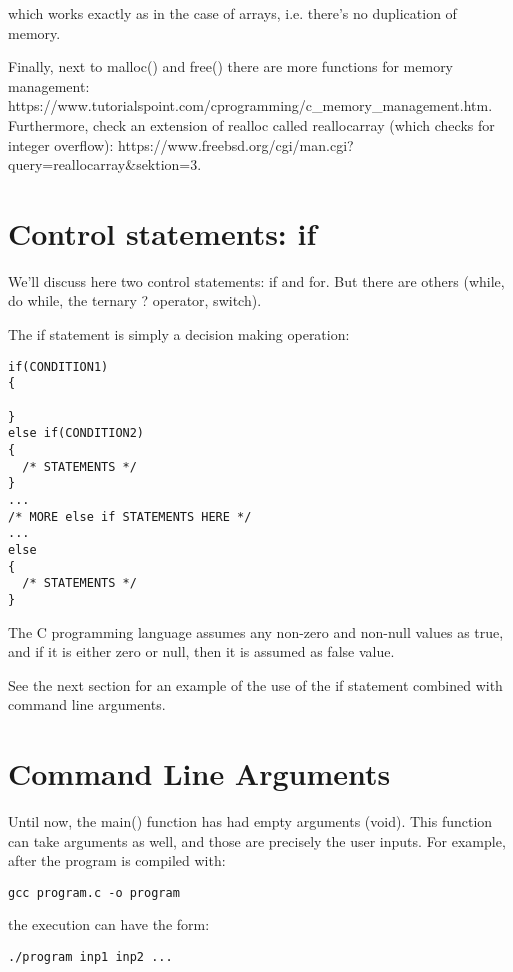 \documentclass[11pt]{article}
\begin{document}
which works exactly as in the case of arrays, i.e. there's no duplication of memory.

Finally, next to malloc() and free() there are more functions for memory management: https://www.tutorialspoint.com/cprogramming/c\_memory\_management.htm. Furthermore, check an extension of realloc called reallocarray (which checks for integer overflow): https://www.freebsd.org/cgi/man.cgi?query=reallocarray\&sektion=3.


\section{Control statements: if}

We'll discuss here two control statements: if and for. But there are others (while, do while, the ternary ? operator, switch).

The if statement is simply a decision making operation:


\begin{lstlisting}[numbers=none]
if(CONDITION1)
{
  
}
else if(CONDITION2)
{
  /* STATEMENTS */
}
...
/* MORE else if STATEMENTS HERE */
...
else
{
  /* STATEMENTS */
}
\end{lstlisting}

The C programming language assumes any non-zero and non-null values as true, and if it is either zero or null, then it is assumed as false value.

See the next section for an example of the use of the if statement combined with command line arguments.


\section{Command Line Arguments}

Until now, the main() function has had empty arguments (void). This function can take arguments as well, and those are precisely the user inputs. For example, after the program is compiled with:

\begin{lstlisting}[numbers=none]
gcc program.c -o program
\end{lstlisting}

the execution can have the form:

\begin{lstlisting}[numbers=none]
./program inp1 inp2 ...
\end{lstlisting}
\end{document}
